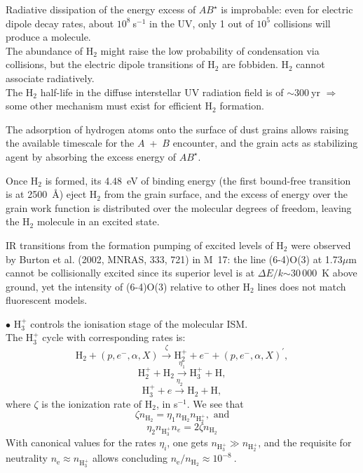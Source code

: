 Radiative dissipation of the energy excess of $AB^\star$ is
improbable: even for electric dipole decay rates, about
$10^8~$s$^{-1}$ in the UV, only 1 out of $10^5$ collisions will produce
a molecule.\\  

The abundance of H$_2$ might raise the low probability of condensation
via collisions, but the electric dipole transitions of H$_2$ are
fobbiden. H$_2$ cannot associate radiatively.\\

The H$_2$ half-life in the diffuse interstellar UV radiation field is
of $\sim 300~$yr $\Rightarrow$ some other mechanism must exist for
efficient H$_2$ formation. 



The adsorption of hydrogen atoms onto the surface of dust grains
allows raising the available timescale for the $A$~+~$B$ encounter,
and the grain acts as stabilizing agent by absorbing the excess energy
of $AB^\star$. 

Once H$_2$ is formed, its 4.48~eV of binding energy (the first
bound-free transition is at 2500~\AA) eject H$_2$ from the grain
surface, and the excess of energy over the grain work function is
distributed over the molecular degrees of freedom, leaving the H$_2$
molecule in an excited state. 


IR transitions from the formation pumping of excited levels of H$_2$
were observed by Burton et al. (2002, MNRAS, 333, 721) in M~17: the
line (6-4)O(3) at 1.73$\mu$m cannot be collisionally excited since its
superior level is at $\Delta E/k$$\sim$30\,000~K above ground, yet the
intensity of (6-4)O(3) relative to other H$_2$ lines does not match
fluorescent models.


$\bullet$ H$_3^+$ controls the ionisation stage of the molecular ISM. \\

The  H$_3^+$  cycle with corresponding rates is:
\[ \mathrm{H}_2 + (p,e^-,\alpha,X) \stackrel{\zeta}{\rightarrow}
\mathrm{H}_2^+ + e^- +  (p,e^-,\alpha,X)^\prime, \]
\[ \mathrm{H}_2^+ +   \mathrm{H}_2 \stackrel{\eta_1} {\rightarrow} \mathrm{H}_3^+ + \mathrm{H}, \]
\[ \mathrm{H}_3^+ + e \stackrel{\eta_2}{\rightarrow}    \mathrm{H}_2 +
\mathrm{H}, \]
where $\zeta$ is the ionization rate of H$_2$, in s$^{-1}$. We see that  
\[ \zeta n_{\mathrm{H}_2} = \eta_1 n_{\mathrm{H}_2}
n_{\mathrm{H}^+_2}, \text{~and} \] 
\[ \eta_2 n_{\mathrm{H}_3^+} n_e =  2 \zeta n_{\mathrm{H}_2}   \] 
With canonical values for the rates $\eta_i$, one gets
$n_{\mathrm{H}_3^+} \gg n_{\mathrm{H}_2^+}$, and the requisite for
neutrality $n_\mathrm{e} \approx n_{\mathrm{H}_3^+}$ allows concluding
$n_\mathrm{e} / n_{\mathrm{H}_2} \approx 10^{-8}~$.



